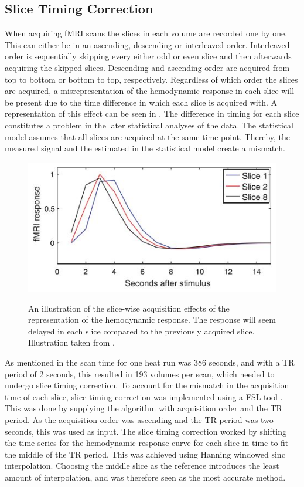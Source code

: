 \subsection{Slice Timing Correction}

When acquiring fMRI scans the slices in each volume are recorded one by one. This can either be in an ascending, descending or interleaved order. Interleaved order is sequentially skipping every either odd or even slice and then afterwards acquiring the skipped slices. Descending and ascending order are acquired from top to bottom or bottom to top, respectively. Regardless of which order the slices are acquired, a misrepresentation of the hemodynamic response in each slice will be present due to the time difference in which each slice is acquired with. A representation of this effect can be seen in . The difference in timing for each slice constitutes a problem in the later statistical analyses of the data. The statistical model assumes that all slices are acquired at the same time point. Thereby, the measured signal and the estimated in the statistical model create a mismatch. \cite{Poldrack2011} \\

\begin{figure}[H] 
	{\includegraphics[width=.65\textwidth]{figures/aBackground/response}}  
	\caption{An illustration of the slice-wise acquisition effects of the representation of the hemodynamic response. The response will seem delayed in each slice compared to the previously acquired slice. Illustration taken from \cite{Poldrack2011}.}
	\label{fig:meth:slice}
\end{figure}

As mentioned in  the scan time for one heat run was 386 seconds, and with a TR period of 2 seconds, this resulted in 193 volumes per scan, which needed to undergo slice timing correction. To account for the mismatch in the acquisition time of each slice, slice timing correction was implemented using a FSL tool \cite{FMRIB2018}. This was done by supplying the algorithm with acquisition order and the TR period. As the acquisition order was ascending and the TR-period was two seconds, this was used as input. The slice timing correction worked by shifting the time series for the hemodynamic response curve for each slice in time to fit the middle of the TR period. This was achieved using Hanning windowed sinc interpolation. Choosing the middle slice as the reference introduces the least amount of interpolation, and was therefore seen as the most accurate method. \cite{Poldrack2011} 

